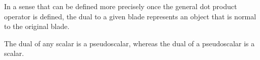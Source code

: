In a sense that can be defined more precisely once the general dot product operator is defined, the dual to a given blade represents an object that is normal to the original blade.

The dual of any scalar is a pseudoscalar, whereas the dual of a pseudoscalar is a scalar.

